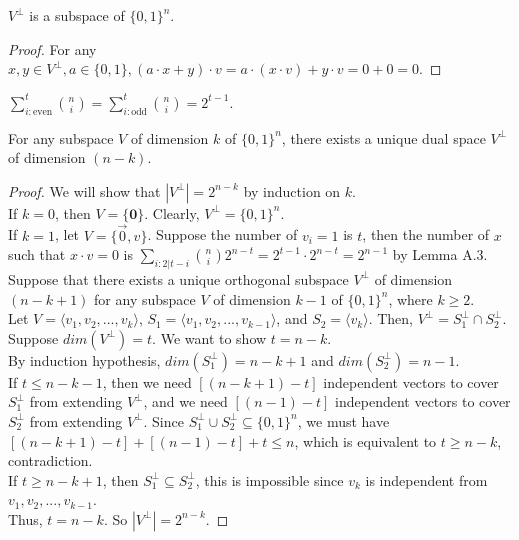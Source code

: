 \begin{theorem}
$V^\perp$ is a subspace of $\{ 0,1 \}^n$.
\end{theorem}

\begin{proof}
For any $x, y \in V^\perp, a \in \{0,1\}, (a \cdot x+y)\cdot v = a \cdot (x \cdot v) + y \cdot v = 0 + 0 = 0$. 
\end{proof} 

\begin{lemma} $\sum \limits_{i: \text{even}}^t {n \choose i} = 
\sum \limits_{i: \text{odd}}^t {n \choose i} = 2^{t-1} $.
\end{lemma}

\begin{theorem} For any subspace $V$ of dimension $k$ of $\{ 0,1 \}^n$, 
there exists a unique dual space $V^\perp$ of dimension $(n-k)$.
\end{theorem}

\begin{proof}
We will show that $|V^\perp| = 2^{n-k}$ by induction on $k$.\\
If $k=0$, then $V = \{ \textbf{0}\}$. Clearly, $V^\perp = \{ 0, 1 \}^n$. \\
If $k=1$, let $V = \{ \vec{0}, v \}$. 
Suppose the number of $v_i = 1$ is $t$, 
then the number of $x$ such that $x \cdot v = 0$ is 
$\sum \limits_{i: 2|t-i} {n \choose i} 2^{n-t} =
2^{t-1} \cdot 2^{n-t} = 2^{n-1}$ by Lemma A.3. \\
Suppose that there exists a unique orthogonal subspace $V^\perp$ 
of dimension $(n-k+1)$ for any subspace $V$ of dimension $k-1$ of $\{ 0,1 \}^n$, where $k \geq 2$. \\
Let $V=\langle v_1, v_2,..., v_{k} \rangle$, 
$S_1 = \langle v_1, v_2,..., v_{k-1}\rangle$, 
and $S_2 = \langle v_{k}\rangle$.  Then, $V^\perp = S_1^\perp \cap S_2^\perp$. \\
Suppose $dim(V^\perp) = t$. We want to show $t = n-k$.\\
By induction hypothesis, $dim(S_1^\perp) = n-k+1$ 
and $dim(S_2^\perp) = n-1$. \\
If $t \leq n-k-1$, then we need $[(n-k+1) - t]$ independent vectors to cover $S_1^\perp$ from extending $V^\perp$, and we need $[(n-1) -t]$ independent vectors to cover $S_2^\perp$ from extending $V^\perp$. Since $S_1^\perp \cup S_2^\perp \subseteq \{ 0,1\}^n$, we must have $[(n-k+1) - t] + [(n-1) -t] + t \leq n$, which is equivalent to $t \geq n-k$, contradiction.\\
If $t \geq n-k+1$, then $S_1^\perp \subseteq S_2^\perp$,
this is impossible since $v_k$ is independent from $v_1, v_2, ..., v_{k-1}$. \\
Thus, $t = n-k$. So $|V^\perp| = 2^{n-k}$. 
\end{proof}

